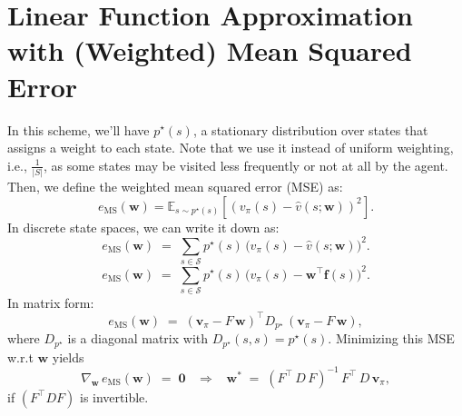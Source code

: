 \section{Linear Function Approximation with (Weighted) Mean Squared Error}

In this scheme, we'll have \(p^\star(s)\), a stationary distribution over states that assigns a weight to each state. Note that we use it instead of uniform weighting, i.e., \(\frac{1}{|S|}\), as some states may be visited less frequently or not at all by the agent. Then, we define the weighted mean squared error (MSE) as:\[
e_{\text{MS}}(\mathbf{w}) 
= \mathbb{E}_{s \sim p^\star(s)}\left[\left(v_\pi(s) - \hat{v}(s;\mathbf{w})\right)^2\right].\]
In discrete state spaces, we can write it down as:
\[
e_{\text{MS}}(\mathbf{w})
\;=\; \sum_{s \in \mathcal{S}} p^\star(s)\,\bigl(v_\pi(s) - \hat{v}(s;\mathbf{w})\bigr)^2.
\]
\[
e_{\text{MS}}(\mathbf{w})
\;=\; \sum_{s \in \mathcal{S}} p^\star(s)\,\bigl(v_\pi(s) - \mathbf{w}^\top \mathbf{f}(s)\bigr)^2.
\]
In matrix form:
\[
e_{\text{MS}}(\mathbf{w}) 
\;=\; (\mathbf{v}_\pi - F\,\mathbf{w})^\top D_{p^\star} \,(\mathbf{v}_\pi - F\,\mathbf{w}),
\]
where \(D_{p^\star}\) is a diagonal matrix with \(D_{p^\star}(s,s) = p^\star(s)\). Minimizing this MSE w.r.t \(\mathbf{w}\) yields
\[
\nabla_{\mathbf{w}}\, e_{\text{MS}}(\mathbf{w}) \;=\; \mathbf{0}
\;\;\;\Rightarrow\;\;\;
\mathbf{w}^*
\;=\; (F^\top\,D\,F)^{-1}\,F^\top\,D\,\mathbf{v}_\pi,
\]
if \((F^\top D F)\) is invertible.
